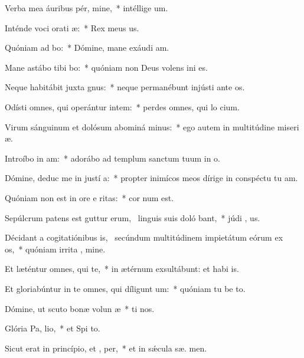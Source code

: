 \item Verba mea áuribus pér, mine,~* intéllige  um.
\item Inténde voci orati æ:~* Rex meus   us.
\item Quóniam ad  bo:~* Dómine, mane exáudi  am.
\item Mane astábo tibi  bo:~* quóniam non Deus volens ini  es.
\item Neque habitábit juxta  gnus:~* neque permanébunt injústi ante  os.
\item Odísti omnes, qui operántur intem:~* perdes omnes, qui lo cium.
\item Virum sánguinum et dolósum abominá minus:~* ego autem in multitúdine miseri æ.
\item Introíbo in  am:~* adorábo ad templum sanctum tuum in  o.
\item Dómine, deduc me in justí a:~* propter inimícos meos dírige in conspéctu tu  am.
\item Quóniam non est in ore e ritas:~* cor  num est.
\item Sepúlcrum patens est guttur erum,~\pscross{} linguis suis doló bant,~* júdi , us.
\item Décidant a cogitatiónibus is,~\pscross{} secúndum multitúdinem impietátum eórum ex os,~* quóniam irrita , mine.
\item Et læténtur omnes, qui   te,~* in ætérnum exsultábunt: et habi  is.
\item Et gloriabúntur in te omnes, qui díligunt  um:~* quóniam tu be to.
\item Dómine, ut scuto bonæ volun æ~* ti nos.
\item Glória Pa,  lio,~* et Spi to.
\item Sicut erat in princípio, et ,  per,~* et in sǽcula sæ. men.
